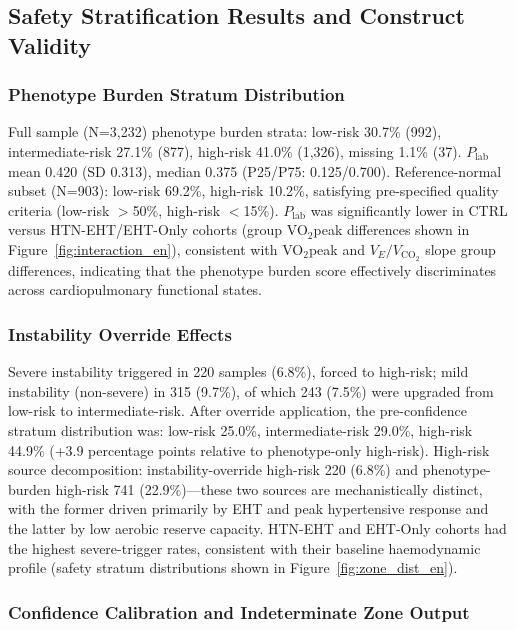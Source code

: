 \documentclass[12pt, a4paper]{article}
\begin{document}
\subsection{Safety Stratification Results and Construct Validity}

\subsubsection{Phenotype Burden Stratum Distribution}

Full sample (N=3,232) phenotype burden strata: low-risk 30.7\% (992),
intermediate-risk 27.1\% (877), high-risk 41.0\% (1,326), missing 1.1\% (37).
$P_{\text{lab}}$ mean 0.420 (SD 0.313), median 0.375 (P25/P75: 0.125/0.700).
Reference-normal subset (N=903): low-risk 69.2\%, high-risk 10.2\%,
satisfying pre-specified quality criteria (low-risk $>$50\%, high-risk $<$15\%).
$P_{\text{lab}}$ was significantly lower in CTRL versus HTN-EHT/EHT-Only cohorts
(group VO$_2$peak differences shown in Figure~\ref{fig:interaction_en}),
consistent with VO$_2$peak and $V_E/V_{\text{CO}_2}$ slope group differences,
indicating that the phenotype burden score effectively discriminates across
cardiopulmonary functional states.

\subsubsection{Instability Override Effects}

Severe instability triggered in 220 samples (6.8\%), forced to high-risk;
mild instability (non-severe) in 315 (9.7\%), of which 243 (7.5\%) were
upgraded from low-risk to intermediate-risk. After override application,
the pre-confidence stratum distribution was: low-risk 25.0\%, intermediate-risk 29.0\%,
high-risk 44.9\% (+3.9 percentage points relative to phenotype-only high-risk).
High-risk source decomposition: instability-override high-risk 220 (6.8\%)
and phenotype-burden high-risk 741 (22.9\%)---these two sources are
mechanistically distinct, with the former driven primarily by EHT and peak
hypertensive response and the latter by low aerobic reserve capacity.
HTN-EHT and EHT-Only cohorts had the highest severe-trigger rates, consistent
with their baseline haemodynamic profile (safety stratum distributions shown in
Figure~\ref{fig:zone_dist_en}).

\subsubsection{Confidence Calibration and Indeterminate Zone Output}
\end{document}

